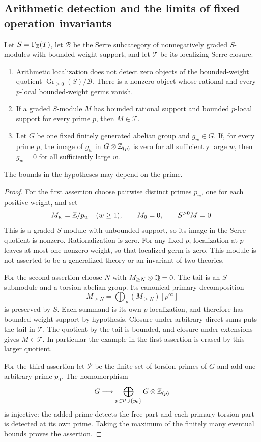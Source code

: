 \subsection{Arithmetic detection and the limits of fixed operation invariants}

\begin{proposition}
\label{sa08:C33}
Let $S=\Gamma_{\mathbb Z}(T)$, let $\mathcal B$ be the Serre subcategory
of nonnegatively graded $S$-modules with bounded weight support,
and let $\mathcal T$ be its localizing Serre closure.
\begin{enumerate}
\item Arithmetic localization does not detect zero objects of the
bounded-weight quotient $\operatorname{Gr}_{\geq0}(S)/\mathcal B$.
There is a nonzero object whose rational and every $p$-local
bounded-weight germs vanish.
\item If a graded $S$-module $M$ has bounded rational support and
bounded $p$-local support for every prime $p$, then $M\in\mathcal T$.
\item Let $G$ be one fixed finitely generated abelian group and
$g_w\in G$. If, for every prime $p$, the image of $g_w$ in
$G\otimes\mathbb Z_{(p)}$ is zero for all sufficiently large $w$, then
$g_w=0$ for all sufficiently large $w$.
\end{enumerate}
The bounds in the hypotheses may depend on the prime.
\end{proposition}
\begin{proof}
For the first assertion choose pairwise distinct primes $p_w$,
one for each positive weight, and set
\[
 M_w=\mathbb Z/p_w\quad(w\geq1),\qquad M_0=0,\qquad S^{>0}M=0.
\]
This is a graded $S$-module with unbounded support, so its image
in the Serre quotient is nonzero. Rationalization is zero.
For any fixed $p$, localization at $p$ leaves at most one nonzero
weight, so that localized germ is zero. This module is not
asserted to be a generalized theory or an invariant of two theories.

For the second assertion choose $N$ with
$M_{\geq N}\otimes\mathbb Q=0$. The tail is an $S$-submodule and a
torsion abelian group. Its canonical primary decomposition
\[
 M_{\geq N}=\bigoplus_p (M_{\geq N})[p^\infty]
\]
is preserved by $S$. Each summand is its own $p$-localization,
and therefore has bounded weight support by hypothesis.
Closure under arbitrary direct sums puts the tail in
$\mathcal T$. The quotient by the tail is bounded, and closure
under extensions gives $M\in\mathcal T$. In particular the
example in the first assertion is erased by this larger quotient.

For the third assertion let $\mathcal P$ be the finite set of
torsion primes of $G$ and add one arbitrary prime $p_0$.
The homomorphism
\[
 G\longrightarrow
 \bigoplus_{p\in\mathcal P\cup\{p_0\}}G\otimes\mathbb Z_{(p)}
\]
is injective: the added prime detects the free part and each
primary torsion part is detected at its own prime. Taking the
maximum of the finitely many eventual bounds proves the assertion.
\end{proof}

